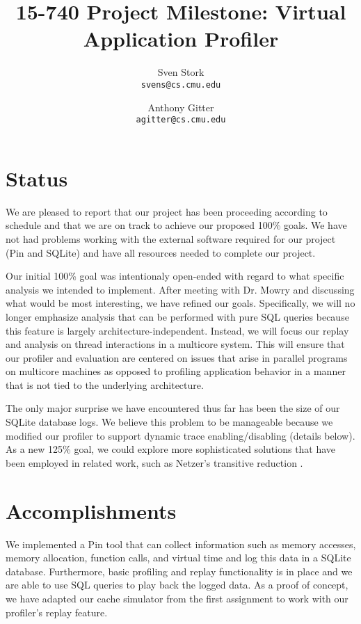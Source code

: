 \documentclass{article}
\title{15-740 Project Milestone: Virtual Application Profiler}
\author{Sven Stork \\ \texttt{svens@cs.cmu.edu}
	\and Anthony Gitter \\ \texttt{agitter@cs.cmu.edu}}
\begin{document}
\maketitle

\vspace{-0.25in}

\section{Status}
We are pleased to report that our project has been proceeding
according to schedule and that we are on track to achieve our
proposed 100\% goals.  We have not had problems working with the
external software required for our project (Pin and SQLite)
and have all resources needed to complete our project.

Our initial 100\% goal was intentionaly open-ended with regard to what
specific analysis we intended to implement.  After meeting with Dr.
Mowry and discussing what would be most interesting,
we have refined our goals.  Specifically, we will no longer emphasize
analysis that can be performed with pure SQL queries
because this feature is largely architecture-independent.  Instead,
we will focus our replay and analysis on thread interactions in a
multicore system.  This will ensure that our profiler and evaluation
are centered on issues that arise in parallel programs on multicore
machines as opposed to profiling application behavior in a manner that
is not tied to the underlying architecture.

The only major surprise we have encountered thus far has been the
size of our SQLite database logs.  We believe this problem to
be manageable because we modified our profiler to
support dynamic trace enabling/disabling
(details below).  As a new 125\% goal, we could explore more
sophisticated solutions that have been employed in related work,
such as Netzer's transitive reduction \cite{netzer1993optimal}.

\section{Accomplishments}
We implemented a Pin tool that can collect information such
as memory accesses, memory allocation, function calls, and virtual time
and log this data in a SQLite database.  Furthermore, basic profiling and
replay functionality is in place and we are able to use SQL queries to
play back the logged data.  As a proof of concept, we have adapted our
cache simulator from the first assignment to work with our
profiler's replay feature.
\end{document}
